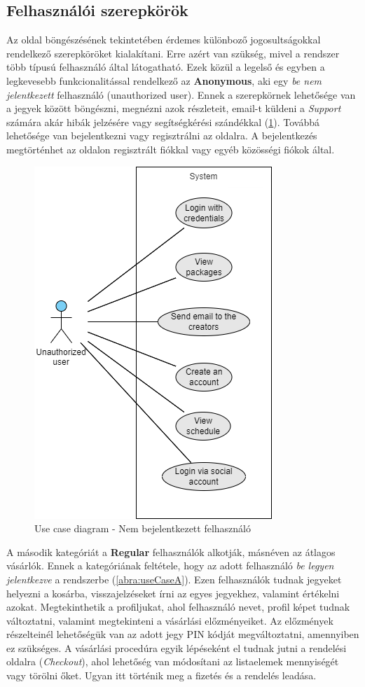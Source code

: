\pagebreak
\subsection {Felhasználói szerepkörök}

Az oldal böngészésének tekintetében érdemes különboző jogosultságokkal rendelkező szerepköröket kialakítani. Erre azért van szükség, mivel a rendszer több típusú felhasználó által látogatható. Ezek közül a legelső és egyben a legkevesebb funkcionalitással rendelkező az \textbf{Anonymous}, aki egy \textit{be nem jelentkezett} felhasználó (unauthorized user). Ennek a szerepkörnek lehetősége van a jegyek között böngészni, megnézni azok részleteit, email-t küldeni a \textit{Support} számára akár hibák jelzésére vagy segítségkérési szándékkal (\ref{abra:useCaseNA}). Továbbá lehetősége van bejelentkezni vagy regisztrálni az oldalra. A bejelentkezés megtörténhet az oldalon regisztrált fiókkal vagy egyéb közösségi fiókok által.

\begin{figure}[!h]
	\centering
	\includegraphics[scale=0.7]{images/useCaseNA}
	\caption{Use case diagram - Nem bejelentkezett felhasználó}
	\label{abra:useCaseNA}
\end{figure}
\pagebreak

A második kategóriát a \textbf{Regular} felhasználók alkotják, másnéven az átlagos vásárlók. Ennek a kategóriának feltétele, hogy az adott felhasználó \textit{be legyen jelentkezve} a rendszerbe (\ref{abra:useCaseA}). Ezen felhasználók tudnak jegyeket helyezni a kosárba, visszajelzéseket írni az egyes jegyekhez, valamint értékelni azokat. Megtekinthetik a profiljukat, ahol felhasználó nevet, profil képet tudnak változtatni, valamint megtekinteni a vásárlási előzményeiket. Az előzmények részelteinél lehetőségük van az adott jegy PIN kódját megváltoztatni, amennyiben ez szükséges. A vásárlási procedúra egyik lépéseként el tudnak jutni a rendelési oldalra (\textit{Checkout}), ahol lehetőség van módosítani az listaelemek mennyiségét vagy törölni őket. Ugyan itt történik meg a fizetés és a rendelés leadása.

